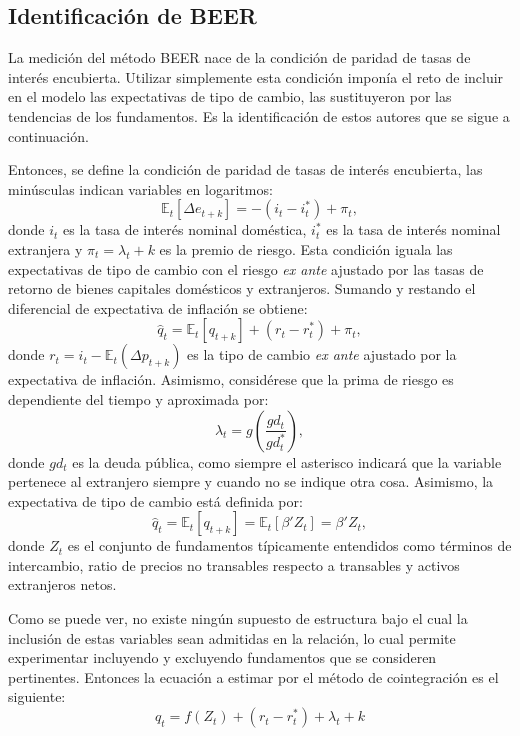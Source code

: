 \documentclass[12pt,letterpaper]{article}
\begin{document}
\subsection{Identificación de BEER}

La medición del método BEER nace de la condición de paridad de tasas de interés encubierta. Utilizar simplemente esta condición imponía el reto de incluir en el modelo las expectativas de tipo de cambio, \cite{clark1999exchange} las sustituyeron por las tendencias de los fundamentos. Es la identificación de estos autores que se sigue a continuación.

Entonces, se define la condición de paridad de tasas de interés encubierta, las minúsculas indican variables en logaritmos:
\begin{equation}
\mathbb{E}_t[\Delta e_{t+k}]=-(i_t-i_t^*)+\pi_t,
\end{equation}
donde $i_t$ es la tasa de interés nominal doméstica, $i_t^*$ es la tasa de interés nominal extranjera y $\pi_t=\lambda_t+k$ es la premio de riesgo. Esta condición iguala las expectativas de tipo de cambio con el riesgo  \emph{ex ante} ajustado por las tasas de retorno de bienes capitales domésticos y extranjeros. Sumando y restando el diferencial de expectativa de inflación se obtiene:
\begin{equation}
\hat{q}_t=\mathbb{E}_t[q_{t+k}]+(r_t-r_t^*)+\pi_t,
\end{equation}
donde $r_t=i_t-\mathbb{E}_t(\Delta p_{t+k})$ es la tipo de cambio \emph{ex ante} ajustado por la expectativa de inflación. Asimismo, considérese que la prima de riesgo es dependiente del tiempo y aproximada por:
\begin{equation}
\lambda_t=g(\frac{gd_t}{gd_t^*}),
\end{equation}
donde $gd_t$ es la deuda pública, como siempre el asterisco indicará que la variable pertenece al extranjero siempre y cuando no se indique otra cosa. Asimismo, la expectativa de tipo de cambio está definida por:
\begin{equation}
\hat{q}_t=\mathbb{E}_t[q_{t+k}]=\mathbb{E}_t[\beta' Z_t]=\beta' Z_t,
\end{equation}
donde $Z_t$ es el conjunto de fundamentos típicamente entendidos como términos de intercambio, ratio de precios no transables respecto a transables y activos extranjeros netos.

Como se puede ver, no existe ningún supuesto de estructura bajo el cual la inclusión de estas variables sean admitidas en la relación, lo cual permite experimentar incluyendo y excluyendo fundamentos que se consideren pertinentes. Entonces la ecuación a estimar por el método de cointegración es el siguiente:
\begin{equation}\label{qb}
q_t=f(Z_t)+(r_t-r_t^*)+\lambda_t+k
\end{equation}
\end{document}
